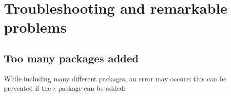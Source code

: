 \section{Troubleshooting and remarkable problems}

\subsection{Too many packages added}
\begin{frame}
	While including many different packages, an error may occure:
	this can be prevented if the $\epsilon$-package can be added:
\end{frame}
